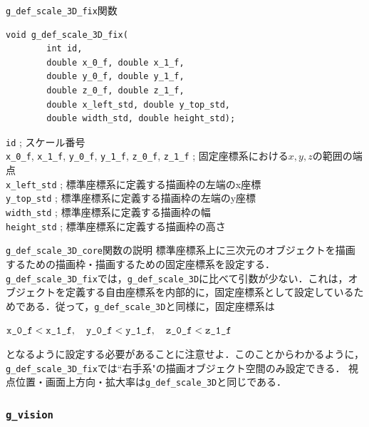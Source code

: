 \documentclass[platex,a4paper,12pt]{jsarticle}%
\begin{document}
\begin{itembox}[l]{\texttt{g\_def\_scale\_3D\_fix}関数}
\begin{verbatim}
void g_def_scale_3D_fix(
        int id,
        double x_0_f, double x_1_f,
        double y_0_f, double y_1_f,
        double z_0_f, double z_1_f,
        double x_left_std, double y_top_std,
        double width_std, double height_std);
\end{verbatim}
\verb|id| ; スケール番号 \\
\verb|x_0_f|, \verb|x_1_f|, \verb|y_0_f|, \verb|y_1_f|, \verb|z_0_f|, \verb|z_1_f| ; 固定座標系における$x, y, z$の範囲の端点 \\
\verb|x_left_std| ; 標準座標系に定義する描画枠の左端のx座標 \\
\verb|y_top_std| ; 標準座標系に定義する描画枠の左端のy座標 \\
\verb|width_std| ; 標準座標系に定義する描画枠の幅 \\
\verb|height_std| ; 標準座標系に定義する描画枠の高さ
\end{itembox}

\begin{itembox}[l]{\texttt{g\_def\_scale\_3D\_core}関数の説明}
標準座標系上に三次元のオブジェクトを描画するための描画枠・描画するための固定座標系を設定する．
\verb|g_def_scale_3D_fix|では，\verb|g_def_scale_3D|に比べて引数が少ない．これは，オブジェクトを定義する自由座標系を内部的に，固定座標系として設定しているためである．従って，\verb|g_def_scale_3D|と同様に，固定座標系は\begin{center}{$\verb|x_0_f| < \verb|x_1_f|,\quad \verb|y_0_f| < \verb|y_1_f|, \quad\verb|z_0_f| < \verb|z_1_f|$}\end{center}となるように設定する必要があることに注意せよ．このことからわかるように，\verb|g_def_scale_3D_fix|では``右手系"の描画オブジェクト空間のみ設定できる．
視点位置・画面上方向・拡大率は\verb|g_def_scale_3D|と同じである．
\end{itembox}




\subsubsection{\texttt{g\_vision}}\label{g_vision}
\end{document}
